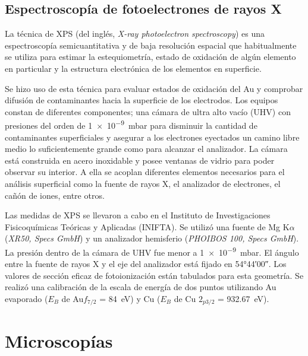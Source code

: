 	
	\subsection{Espectroscopía de fotoelectrones de rayos X}

		La técnica de XPS (del inglés, \textit {X-ray photoelectron spectroscopy}) es una espectroscopía semicuantitativa y de baja resolución espacial que habitualmente se utiliza para estimar la estequiometría, estado de oxidación de algún elemento en particular y la estructura electrónica de los elementos en superficie.\cite{siegbahn1956,siegbahn1981}

		Se hizo uso de esta técnica para evaluar estados de oxidación del Au y comprobar difusión de contaminantes hacia la superficie de los electrodos.  Los equipos constan de diferentes componentes; una cámara de ultra alto vacío (UHV) con presiones del orden de \SI{1e-9}{mbar} para disminuir la cantidad de contaminantes superficiales y asegurar a los electrones eyectados un camino libre medio lo suficientemente grande como para alcanzar el analizador. La cámara está construida en acero inoxidable y posee ventanas de vidrio para poder observar su interior. A ella se acoplan diferentes elementos necesarios para el análisis superficial como la fuente de rayos X, el analizador de electrones, el cañón de iones, entre otros.\cite{XPS1978,Corthey2012}

		Las medidas de XPS se llevaron a cabo en el Instituto de Investigaciones Fisicoquímicas Teóricas y Aplicadas (INIFTA). Se utilizó una fuente de Mg K$\alpha$ (\textit{XR50, Specs GmbH}) y un analizador hemisferio (\textit{PHOIBOS 100, Specs GmbH}). La presión dentro de la cámara de UHV fue menor a \SI{1e-9}{mbar}. El ángulo entre la fuente de rayos X y el eje del analizador está fijado en \ang{54;44;00}. Los valores de sección eficaz de fotoionización están tabulados para esta geometría. Se realizó una calibración de la escala de energía de dos puntos utilizando Au evaporado ($E_B$ de Au$f_{7/2}$ = \SI{84}{\electronvolt}) y Cu ($E_B$ de Cu $2_{p3/2}$ = \SI{932.67}{\electronvolt}).
		
\section{Microscopías}\label{sec:micros}
		
